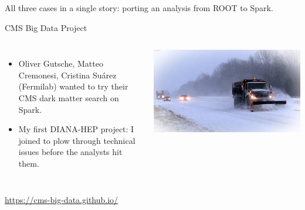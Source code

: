 \documentclass[aspectratio=169]{beamer}
\begin{document}
\begin{frame}{}
\vspace{0.5 cm}
\begin{center}
\begin{minipage}{0.8\linewidth}
\begin{center}
\Large All three cases in a single story: porting an analysis from ROOT to Spark.
\end{center}
\end{minipage}
\end{center}
\end{frame}

\begin{frame}{CMS Big Data Project}
\vspace{1 cm}
\begin{columns}
\begin{itemize}
\item Oliver Gutsche, Matteo Cremonesi, Cristina Su\'arez (Fermilab) wanted to try their CMS dark matter search on Spark.
\item My first DIANA-HEP project: I joined to plow through technical issues before the analysts hit them.
\end{itemize}

\includegraphics[width=\linewidth]{snowplow.jpg}
\end{columns}

\vspace{0.25 cm}
\begin{center}
\textcolor{blue}{\underline{\url{https://cms-big-data.github.io/}}}
\end{center}
\end{frame}
\end{document}
